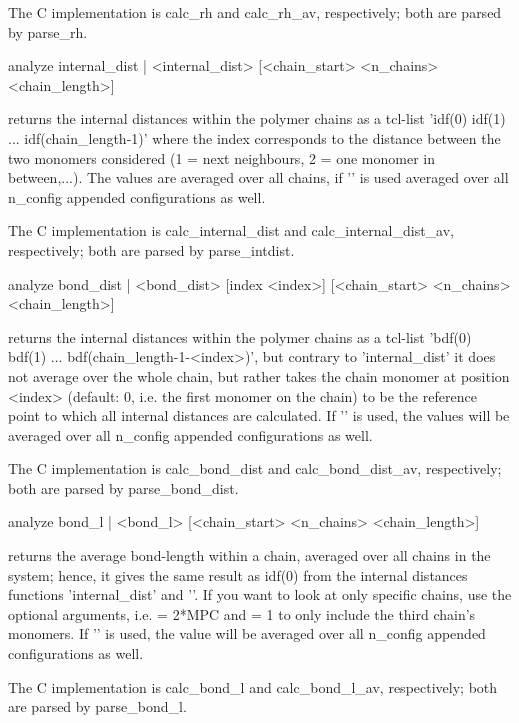 {The C implementation is calc\_rh and calc\_rh\_av, respectively; both are parsed by parse\_rh.

\begin{tclcode}
 analyze { internal_dist | <internal_dist> } [<chain_start>
 <n_chains> <chain_length>] 
\end{tclcode}
returns the internal distances within the  polymer chains as a tcl-list 'idf(0) idf(1) ... idf(chain\_length-1)' where the index corresponds to the distance between the two monomers considered (1 = next neighbours, 2 = one monomer in between,...). The values are averaged over all chains, if '' is used averaged over all n\_config appended configurations as well.

The C implementation is calc\_internal\_dist and calc\_internal\_dist\_av, respectively; both are parsed by parse\_intdist.

\begin{tclcode}
 analyze { bond_dist | <bond_dist> } [index <index>]
 [<chain_start> <n_chains> <chain_length>] 
\end{tclcode}
returns the internal distances within the  polymer chains as a tcl-list 'bdf(0) bdf(1) ... bdf(chain\_length-1-<index>)', but contrary to 'internal\_dist' it does not average over the whole chain, but rather takes the chain monomer at position <index> (default: 0, i.e. the first monomer on the chain) to be the reference point to which all internal distances are calculated. If '' is used, the values will be averaged over all n\_config appended configurations as well.

The C implementation is calc\_bond\_dist and calc\_bond\_dist\_av, respectively; both are parsed by parse\_bond\_dist.

\begin{tclcode}
 analyze { bond_l | <bond_l> } [<chain_start> <n_chains> <chain_length>] 
\end{tclcode}
returns the average bond-length within a chain, averaged over all chains in the system; hence, it gives the same result as idf(0) from the internal distances functions 'internal\_dist' and ''. If you want to look at only specific chains, use the optional arguments, i.e.  = 2*MPC and  = 1 to only include the third chain's monomers. If '' is used, the value will be averaged over all n\_config appended configurations as well.

The C implementation is calc\_bond\_l and calc\_bond\_l\_av, respectively; both are parsed by parse\_bond\_l.

}
